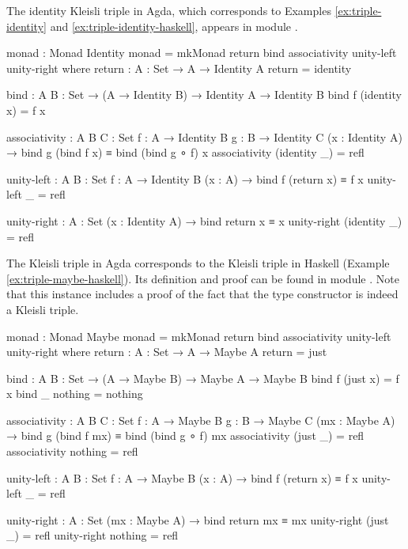 \begin{example}
  \label{ex:triple-id-agda}
  The identity Kleisli triple in Agda, which corresponds to Examples
  \ref{ex:triple-identity} and \ref{ex:triple-identity-haskell},
  appears in module .

  \begin{codeagda}
monad : Monad Identity
monad = mkMonad return bind associativity unity-left unity-right
  where
    return : {A : Set} → A → Identity A
    return = identity

    bind : {A B : Set} → (A → Identity B) → Identity A → Identity B
    bind f (identity x) = f x

    associativity : {A B C : Set} {f : A → Identity B} {g : B → Identity C}
                    (x : Identity A) → bind g (bind f x) ≡ bind (bind g ∘ f) x
    associativity (identity _) = refl

    unity-left : {A B : Set} {f : A → Identity B} (x : A) →
                 bind f (return x) ≡ f x
    unity-left _ = refl

    unity-right : {A : Set} (x : Identity A) → bind return x ≡ x
    unity-right (identity _) = refl
  \end{codeagda}
\end{example}

\begin{example}
  \label{ex:triple-maybe-agda}

  The  Kleisli triple in Agda corresponds to the
   Kleisli triple in Haskell (Example
  \ref{ex:triple-maybe-haskell}). Its definition and proof can be found in module
  . Note that this instance includes a
  proof of the fact that the  type constructor is
  indeed a Kleisli triple.

  \begin{codeagda}
monad : Monad Maybe
monad = mkMonad return bind associativity unity-left unity-right
  where
    return : {A : Set} → A → Maybe A
    return = just

    bind : {A B : Set} → (A → Maybe B) → Maybe A → Maybe B
    bind f (just x) = f x
    bind _ nothing  = nothing

    associativity : {A B C : Set} {f : A → Maybe B} {g : B → Maybe C}
                    (mx : Maybe A) → bind g (bind f mx) ≡ bind (bind g ∘ f) mx
    associativity (just _) = refl
    associativity nothing  = refl

    unity-left : {A B : Set} {f : A → Maybe B} (x : A) →
                 bind f (return x) ≡ f x
    unity-left _ = refl

    unity-right : {A : Set} (mx : Maybe A) → bind return mx ≡ mx
    unity-right (just _) = refl
    unity-right nothing  = refl
  \end{codeagda}

\end{example}

